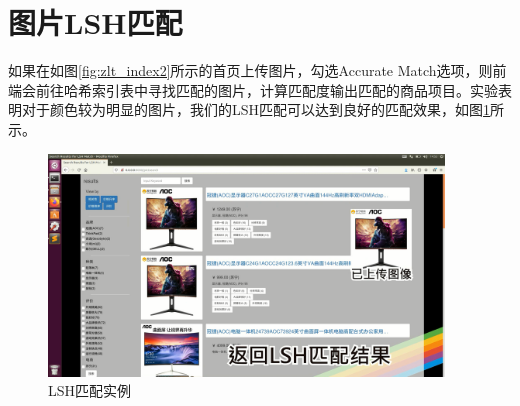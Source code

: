\section{图片LSH匹配}

如果在如图\ref{fig:zlt_index2}所示的首页上传图片，勾选Accurate Match选项，则前端会前往哈希索引表中寻找匹配的图片，计算匹配度输出匹配的商品项目。实验表明对于颜色较为明显的图片，我们的LSH匹配可以达到良好的匹配效果，如图\ref{fig:zlt_LSH}所示。


\begin{figure}[htbp]
\centering
\includegraphics[width=10.5cm]{img/zlt/LSH.png}
\caption{LSH匹配实例}
\label{fig:zlt_LSH}
\end{figure}
